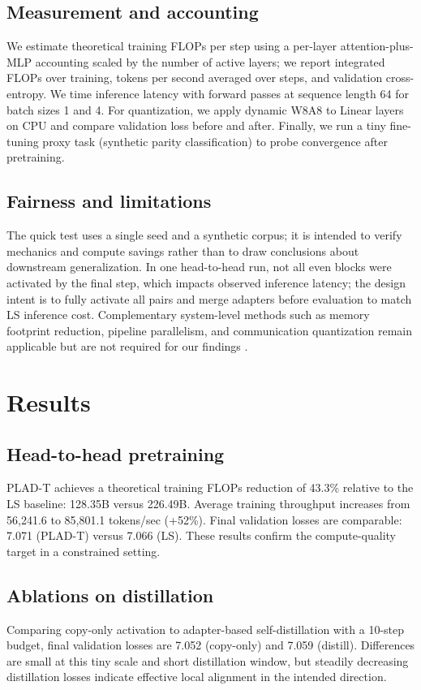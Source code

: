 \documentclass{article}
\begin{document}
\subsection{Measurement and accounting}
We estimate theoretical training FLOPs per step using a per-layer attention-plus-MLP accounting scaled by the number of active layers; we report integrated FLOPs over training, tokens per second averaged over steps, and validation cross-entropy. We time inference latency with forward passes at sequence length 64 for batch sizes 1 and 4. For quantization, we apply dynamic W8A8 to Linear layers on CPU and compare validation loss before and after. Finally, we run a tiny fine-tuning proxy task (synthetic parity classification) to probe convergence after pretraining.

\subsection{Fairness and limitations}
The quick test uses a single seed and a synthetic corpus; it is intended to verify mechanics and compute savings rather than to draw conclusions about downstream generalization. In one head-to-head run, not all even blocks were activated by the final step, which impacts observed inference latency; the design intent is to fully activate all pairs and merge adapters before evaluation to match LS inference cost. Complementary system-level methods such as memory footprint reduction, pipeline parallelism, and communication quantization remain applicable but are not required for our findings \cite{andoorveedu-2022-tempo,narayanan-2020-memory,jia-2024-toward}.

\section{Results}
\subsection{Head-to-head pretraining}
PLAD-T achieves a theoretical training FLOPs reduction of 43.3\% relative to the LS baseline: 128.35B versus 226.49B. Average training throughput increases from 56,241.6 to 85,801.1 tokens/sec (+52\%). Final validation losses are comparable: 7.071 (PLAD-T) versus 7.066 (LS). These results confirm the compute-quality target in a constrained setting.

\subsection{Ablations on distillation}
Comparing copy-only activation to adapter-based self-distillation with a 10-step budget, final validation losses are 7.052 (copy-only) and 7.059 (distill). Differences are small at this tiny scale and short distillation window, but steadily decreasing distillation losses indicate effective local alignment in the intended direction.
\end{document}
